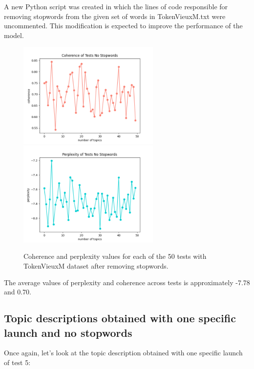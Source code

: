 \documentclass[10pt]{article} %
\begin{document}
	A new Python script was created in which the lines of code responsible for removing stopwords from the given set of words in TokenVieuxM.txt were uncommented. This modification is expected to improve the performance of the model. 
	
		\begin{figure}[H]
		\centering
		\includegraphics[width=7cm]{images/coherence_no_stopwords}
		\includegraphics[width=7cm]{images/perplexity_no_stopwords}
	\caption{Coherence and perplexity values for each of the 50 tests with TokenVieuxM dataset after removing stopwords.}
\end{figure}
	
	The average values of perplexity and coherence across tests is approximately -7.78 and 0.70. 
	
	\subsection{Topic descriptions obtained with one specific launch and no stopwords}\label{test_8_ns_1}
	
	Once again, let's look at the topic description obtained with one specific launch of test 5:
	
\end{document}

